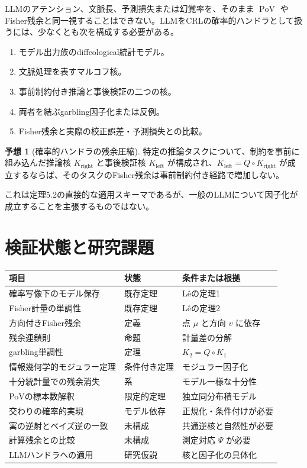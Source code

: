 \documentclass[a4paper,11pt]{ltjsarticle}
\theoremstyle{definition}
\newtheorem{conjecture}[definition]{予想}
\theoremstyle{plain}
\newcommand{\PoV}{\operatorname{PoV}}
\begin{document}
LLMのアテンション、文脈長、予測損失または幻覚率を、そのまま $\PoV$ やFisher残余と同一視することはできない。LLMをCRLの確率的ハンドラとして扱うには、少なくとも次を構成する必要がある。
\begin{enumerate}
 \item モデル出力族のdiffeological統計モデル。
 \item 文脈処理を表すマルコフ核。
 \item 事前制約付き推論と事後検証の二つの核。
 \item 両者を結ぶgarbling因子化または反例。
 \item Fisher残余と実際の校正誤差・予測損失との比較。
\end{enumerate}

\begin{conjecture}[確率的ハンドラの残余圧縮]
特定の推論タスクについて、制約を事前に組み込んだ推論核 $K_{\mathrm{right}}$ と事後検証核 $K_{\mathrm{left}}$ が構成され、$K_{\mathrm{left}}=Q\circ K_{\mathrm{right}}$ が成立するならば、そのタスクのFisher残余は事前制約付き経路で増加しない。
\end{conjecture}

これは定理5.2の直接的な適用スキーマであるが、一般のLLMについて因子化が成立することを主張するものではない。

\section{検証状態と研究課題}

\begin{center}
\begin{tabular}{p{} p{} p{}}
\toprule
項目 & 状態 & 条件または根拠 \\
\midrule
確率写像下のモデル保存 & 既存定理 & Lêの定理1 \\
Fisher計量の単調性 & 既存定理 & Lêの定理2 \\
方向付きFisher残余 & 定義 & 点 $\mu$ と方向 $v$ に依存 \\
残余連鎖則 & 命題 & 計量差の分解 \\
garbling単調性 & 定理 & $K_2=Q\circ K_1$ \\
情報幾何学的モジュラー定理 & 条件付き定理 & モジュラー因子化 \\
十分統計量での残余消失 & 系 & モデル一様な十分性 \\
PoVの標本数解釈 & 限定的定理 & 独立同分布積モデル \\
交わりの確率的実現 & モデル依存 & 正規化・条件付けが必要 \\
寓の逆射とベイズ逆の一致 & 未構成 & 共通逆核と自然性が必要 \\
計算残余との比較 & 未構成 & 測定対応 $\Psi$ が必要 \\
LLMハンドラへの適用 & 研究仮説 & 核と因子化の具体化 \\
\bottomrule
\end{tabular}
\end{center}
\end{document}

